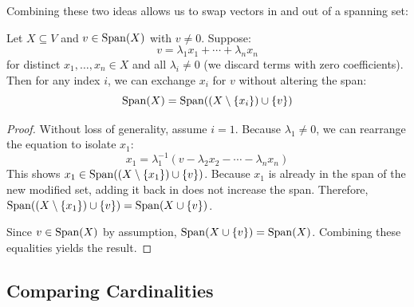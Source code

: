 \documentclass[../linear_algebra_and_groups.tex]{subfiles}
\begin{document}
Combining these two ideas allows us to swap vectors in and out of a spanning set:

\begin{lemma}
\label{lem:steinitz}
    \begin{shaded*}
        Let $X \subseteq V$ and $v \in \operatorname{Span}(X)$ with $v \ne 0$. Suppose:
        \[ v = \lambda_1 x_1 + \cdots + \lambda_n x_n \]
        for distinct $x_1, \dots, x_n \in X$ and all $\lambda_i \ne 0$ (we discard terms with zero coefficients). Then for any index $i$, we can exchange $x_i$ for $v$ without altering the span:
        \[ \operatorname{Span}(X) = \operatorname{Span}((X \setminus \{x_i\}) \cup \{v\}) \]
    \end{shaded*}
\end{lemma}
\begin{proof}
    Without loss of generality, assume $i=1$. Because $\lambda_1 \ne 0$, we can rearrange the equation to isolate $x_1$:
    \[ x_1 = \lambda_1^{-1}(v - \lambda_2 x_2 - \cdots - \lambda_n x_n) \]
    This shows $x_1 \in \operatorname{Span}((X \setminus \{x_1\}) \cup \{v\})$. Because $x_1$ is already in the span of the new modified set, adding it back in does not increase the span. Therefore, $\operatorname{Span}((X \setminus \{x_1\}) \cup \{v\}) = \operatorname{Span}(X \cup \{v\})$. 
    
    Since $v \in \operatorname{Span}(X)$ by assumption, $\operatorname{Span}(X \cup \{v\}) = \operatorname{Span}(X)$. Combining these equalities yields the result.
    \qedhere
\end{proof}



\subsection{Comparing Cardinalities}
\end{document}

